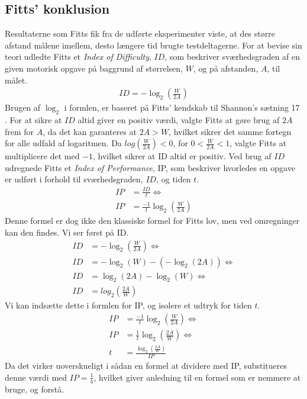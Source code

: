 \subsection*{Fitts' konklusion}
Resultaterne som Fitts fik fra de udførte eksperimenter viste, at des større afstand målene imellem, desto længere tid brugte testdeltagerne. For at bevise sin teori udledte Fitts et \textit{Index of Difficulty}, $ID$, som beskriver sværhedsgraden af en given motorisk opgave på baggrund af størrelsen, $W$, og på afstanden, $A$, til målet.
\begin{align*}
ID = -\log_2\left(\frac{W}{2A}\right)
\end{align*}
Brugen af $\log_2$ i formlen, er baseret på Fitts' kendskab til Shannon's sætning 17 \cite{goldberg2015}. For at sikre at $ID$ altid giver en positiv værdi, valgte Fitts at gøre brug af $2A$ frem for $A$, da det kan garanteres at $2A > W$, hvilket sikrer det samme fortegn for alle udfald af logaritmen. Da $log\left(\frac{W}{2A}\right)<0$, for $0<\frac{W}{2A}<1$, valgte Fitts at multiplicere det med $-1$, hvilket sikrer at ID altid er positiv.
Ved brug af $ID$ udregnede Fitts et \textit{Index of Performance}, IP, som beskriver hvorledes en opgave er udført i forhold til sværhedsgraden, $ID$, og tiden $t$.
\begin{align*}
IP &= \frac{ID}{t}\Leftrightarrow\\
IP &= \frac{-1}{t}\log_2\left(\frac{W}{2A}\right)
\end{align*}
Denne formel er dog ikke den klassiske formel for Fitts lov, men ved omregninger kan den findes. Vi ser først på ID.
\begin{align*}
ID &= -\log_2\left(\frac{W}{2A}\right) \Leftrightarrow\\
ID &= -\log_2\left(W\right)-\left(-\log_2\left(2A\right)\right) \Leftrightarrow\\
ID &= \log_2\left(2A\right)-\log_2\left(W\right) \Leftrightarrow\\
ID &= log_2\left(\frac{2A}{W}\right)
\end{align*}
Vi kan indsætte dette i formlen for IP, og isolere et udtryk for tiden $t$.
\begin{align*}
IP &=\frac{-1}{t}\log_2\left(\frac{W}{2A}\right) \Leftrightarrow\\ 
IP &= \frac{1}{t}\log_2\left(\frac{2A}{W}\right) \Leftrightarrow\\ 
t &= \frac{\log_2\left(\frac{2A}{W}\right)}{IP}
\end{align*}
Da det virker uoverskueligt i sådan en formel at dividere med IP, substitueres denne værdi med $IP = \frac{1}{b}$, hvilket giver anledning til en formel som er nemmere at bruge, og forstå.
